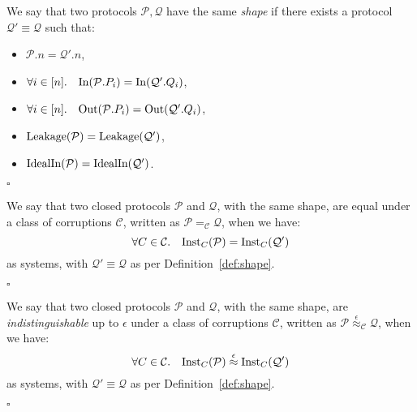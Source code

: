 \begin{definition}[Shape]
  \label{def:shape}
  We say that two protocols $\mathcal{P}, \mathcal{Q}$ have the same \emph{shape}
  if there exists a protocol $\mathcal{Q}' \equiv \mathcal{Q}$ such that:
  \begin{itemize}
    \item $\mathcal{P}.n = \mathcal{Q}'.n$,
    \item $\forall i \in [n].\quad \text{In}(\mathcal{P}.P_i) = \text{In}(\mathcal{Q}'.Q_i)$,
    \item $\forall i \in [n].\quad \text{Out}(\mathcal{P}.P_i) = \text{Out}(\mathcal{Q}'.Q_i)$,
    \item $\text{Leakage}(\mathcal{P}) = \text{Leakage}(\mathcal{Q}')$,
    \item $\text{IdealIn}(\mathcal{P}) = \text{IdealIn}(\mathcal{Q}')$.
  \end{itemize}

  $\square$
\end{definition}

\begin{definition}
  We say that two closed protocols $\mathcal{P}$ and $\mathcal{Q}$,
  with the same shape,
  are equal under a class of corruptions $\mathcal{C}$,
  written as $\mathcal{P} =_{\mathcal{C}} \mathcal{Q}$, when we have:
  $$
  \forall C \in \mathcal{C}.\quad \text{Inst}_C(\mathcal{P}) = \text{Inst}_C(\mathcal{Q'})
  $$
  as systems, with $\mathcal{Q}' \equiv \mathcal{Q}$ as per 
  Definition~\ref{def:shape}.

  $\square$

\end{definition}

\begin{definition}[Indistinguishability]
  We say that two closed protocols $\mathcal{P}$ and $\mathcal{Q}$,
  with the same shape,
  are \emph{indistinguishable} up to $\epsilon$ under a class of corruptions $\mathcal{C}$,
  written as $\mathcal{P} \overset{\epsilon}{\approx}_{\mathcal{C}} \mathcal{Q}$, when we have:
  $$
  \forall C \in \mathcal{C}.\quad \text{Inst}_C(\mathcal{P}) \overset{\epsilon}{\approx} \text{Inst}_C(\mathcal{Q'})
  $$
  as systems, with $\mathcal{Q}' \equiv \mathcal{Q}$ as per 
  Definition~\ref{def:shape}.

  $\square$

\end{definition}

